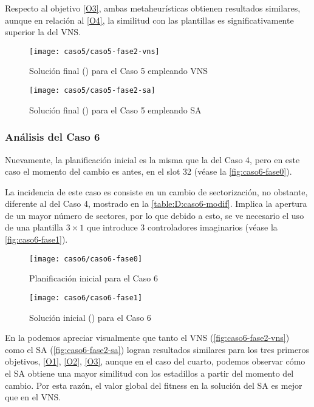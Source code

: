 Respecto al objetivo \ref{O3}, ambas metaheurísticas obtienen resultados similares, aunque en relación al \ref{O4}, la similitud con las plantillas es significativamente superior la del VNS.

\begin{figure}[!]
	\centering
	\texttt{[image: caso5/caso5-fase2-vns]}
	\caption{Solución final (\fasedos{}) para el Caso 5 empleando VNS}
	\label{fig:caso5-fase2-vns}
\end{figure}

\begin{figure}[!]
	\centering
	\texttt{[image: caso5/caso5-fase2-sa]}
	\caption{Solución final (\fasedos{}) para el Caso 5 empleando SA}
	\label{fig:caso5-fase2-sa}
\end{figure}
\subsubsection{Análisis del Caso 6}

Nuevamente, la planificación inicial es la misma que la del Caso 4, pero en este caso el momento del cambio es antes, en el slot 32 (véase la \autoref{fig:caso6-fase0}).

La incidencia de este caso es consiste en un cambio de sectorización, no obstante, diferente al del Caso 4, mostrado en la \autoref{table:D:caso6-modif}. Implica la apertura de un mayor número de sectores, por lo que debido a esto, se ve necesario el uso de una plantilla $3 \times 1$ que introduce 3 controladores imaginarios (véase la \autoref{fig:caso6-fase1}).

\begin{figure}[!]
	\centering
	\texttt{[image: caso6/caso6-fase0]}
	\caption{Planificación inicial para el Caso 6}
	\label{fig:caso6-fase0}
\end{figure}

\begin{figure}[!]
	\centering
	\texttt{[image: caso6/caso6-fase1]}
	\caption{Solución inicial (\faseuno{}) para el Caso 6}
	\label{fig:caso6-fase1}
\end{figure}

En la \fasedos{} podemos apreciar visualmente que tanto el VNS (\autoref{fig:caso6-fase2-vns}) como el SA (\autoref{fig:caso6-fase2-sa}) logran resultados similares para los tres primeros objetivos, \ref{O1}, \ref{O2}, \ref{O3}, aunque en el caso del cuarto, podemos observar cómo el SA obtiene una mayor similitud con los estadillos a partir del momento del cambio. Por esta razón, el valor global del fitness en la solución del SA es mejor que en el VNS.

